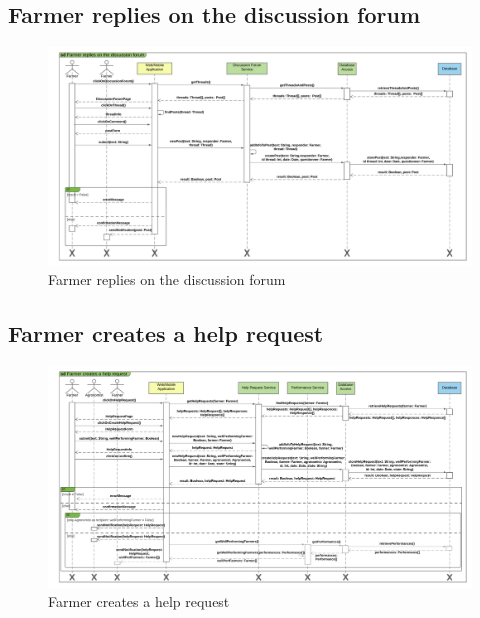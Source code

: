 \subsection{Farmer replies on the discussion forum}

\newpage
\begin{landscape}
\begin{figure}[h]
\vspace*{-2cm}
\noindent
\centering
\centerline{\includegraphics[scale= 0.108]{./Images/Sequence diagram/Farmer replies on the discussion forum.png}}
    \caption{Farmer replies on the discussion forum}
    \vspace*{-12cm}
\end{figure}
\fillandplacepagenumber
\end{landscape}

\subsection{Farmer creates a help request}

\newpage
\begin{landscape}
\begin{figure}[h]
\vspace*{-2cm}
\noindent
\centering
\centerline{\includegraphics[scale= 0.108]{./Images/Sequence diagram/Farmer creates a help request.png}}
    \caption{Farmer creates a help request}
    \vspace*{-12cm}
\end{figure}
\fillandplacepagenumber
\end{landscape}

